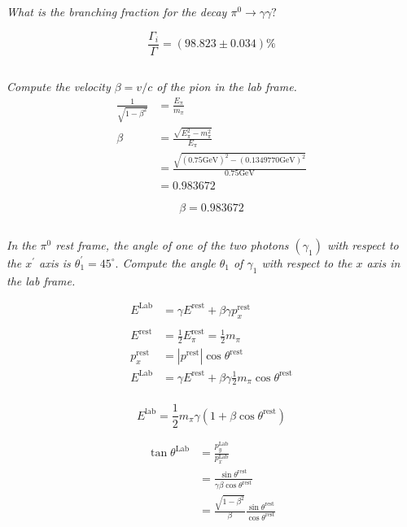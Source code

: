 \documentclass{article}
\begin{document}
\subsection{}
\textit{What is the branching fraction for the decay $\pi^{0} \rightarrow \gamma \gamma ?$}

$$\frac{\Gamma_i}{\Gamma} = (98.823 \pm 0.034) \%$$


\subsection{}
\textit{Compute the velocity $\beta=v / c$ of the pion in the lab frame.}
\begin{align*}
    \frac{1}{\sqrt{1-\beta ^2}}&= \frac{E_\pi}{m_\pi}\\
    \beta &= \frac{\sqrt{E_\pi^2-m_\pi^2}}{E_\pi}\\
    &= \frac{\sqrt{(0.75 \mathrm{GeV})^2-(0.1349770\mathrm{GeV})^2}}{0.75 \mathrm{GeV}}\\
    &= 0.983672
\end{align*}

$$\boxed{\beta = 0.983672}$$

\subsection{}
\textit{In the $\pi^{0}$ rest frame, the angle of one of the two photons $\left(\gamma_{1}\right)$ with respect to the $x^{\prime}$ axis is $\theta_{1}^{\prime}=45^{\circ} .$ Compute the angle $\theta_{1}$ of $\gamma_{1}$ with respect to the $x$ axis in the lab frame.}


\begin{align*}
    E^{\mathrm{Lab}}&=\gamma E^{\mathrm{rest}}+\beta \gamma p_{x}^{\mathrm{rest}}\\
    &\\
    E^{\mathrm{rest}}&=\frac{1}{2} E_{\pi}^{\mathrm{rest}}=\frac{1}{2} m_{\pi}\\
    p_{x}^{\mathrm{rest}}&=\left|p^{\mathrm{rest}}\right| \cos \theta^{\mathrm{rest}}\\
    E^{\mathrm{Lab}}&=\gamma E^{\mathrm{rest}}+\beta \gamma \frac{1}{2} m_{\pi} \cos \theta^{\mathrm{rest}}\\
\end{align*}

$$E^{\mathrm{lab}}=\frac{1}{2} m_{\pi} \gamma\left(1+\beta \cos \theta^{\mathrm{rest}}\right)$$

\begin{align*}
    \tan \theta^\mathrm{Lab}&=\frac{p_{y}^\mathrm{Lab}}{p_{x}^\mathrm{Lab}}\\
    &=\frac{ \sin \theta^{\mathrm{rest}}}{\gamma\beta  \cos \theta^{\mathrm{rest}}}\\
    &= \frac{\sqrt{1-\beta^{2}}}{\beta} \frac{\sin \theta^{\mathrm{rest}}}{  \cos \theta^{\mathrm{rest}}}
\end{align*}
\end{document}

